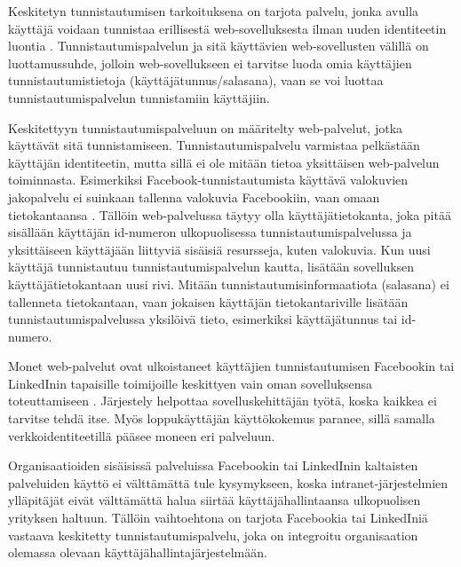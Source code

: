 Keskitetyn tunnistautumisen tarkoituksena on tarjota palvelu, jonka avulla käyttäjä voidaan tunnistaa erillisestä web-sovelluksesta ilman uuden identiteetin luontia \cite{facebook}. Tunnistautumispalvelun ja sitä käyttävien web-sovellusten välillä on luottamussuhde, jolloin web-sovellukseen ei tarvitse luoda omia käyttäjien tunnistautumistietoja (käyttäjätunnus/salasana), vaan se voi luottaa tunnistautumispalvelun tunnistamiin käyttäjiin.

Keskitettyyn tunnistautumispalveluun on määritelty web-palvelut, jotka käyttävät sitä tunnistamiseen. Tunnistautumispalvelu varmistaa pelkästään käyttäjän identiteetin, mutta sillä ei ole mitään tietoa yksittäisen web-palvelun toiminnasta. Esimerkiksi Facebook-tunnistautumista käyttävä valokuvien jakopalvelu ei suinkaan tallenna valokuvia Facebookiin, vaan omaan tietokantaansa \cite{web_resources}. Tällöin web-palvelussa täytyy olla käyttäjätietokanta, joka pitää sisällään käyttäjän id-numeron ulkopuolisessa tunnistautumispalvelussa ja yksittäiseen käyttäjään liittyviä sisäisiä resursseja, kuten valokuvia. Kun uusi käyttäjä tunnistautuu tunnistautumispalvelun kautta, lisätään sovelluksen käyttäjätietokantaan uusi rivi. Mitään tunnistautumisinformaatiota (salasana) ei tallenneta tietokantaan, vaan jokaisen käyttäjän tietokantariville lisätään tunnistautumispalvelussa yksilöivä tieto, esimerkiksi käyttäjätunnus tai id-numero.

Monet web-palvelut ovat ulkoistaneet käyttäjien tunnistautumisen Facebookin tai LinkedInin tapaisille toimijoille keskittyen vain oman sovelluksensa toteuttamiseen \cite{facebook}. Järjestely helpottaa sovelluskehittäjän työtä, koska kaikkea ei tarvitse tehdä itse. Myös loppukäyttäjän käyttökokemus paranee, sillä samalla verkkoidentiteetillä pääsee moneen eri palveluun.

Organisaatioiden sisäisissä palveluissa Facebookin tai LinkedInin kaltaisten palveluiden käyttö ei välttämättä tule kysymykseen, koska intranet-järjestelmien ylläpitäjät eivät välttämättä halua siirtää käyttäjähallintaansa ulkopuolisen yrityksen haltuun. Tällöin vaihtoehtona on tarjota Facebookia tai LinkedIniä vastaava keskitetty tunnistautumispalvelu, joka on integroitu organisaation olemassa olevaan käyttäjähallintajärjestelmään.